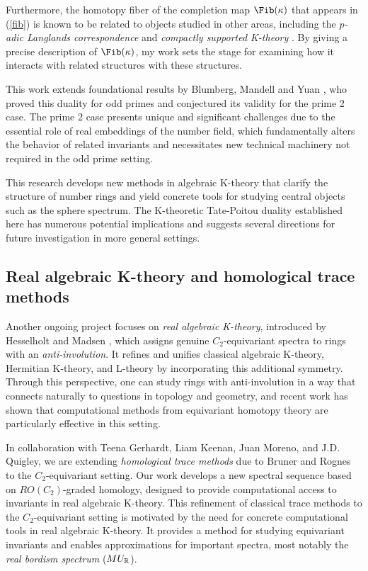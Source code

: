 \documentclass[11pt]{article}
\begin{document}
Furthermore, the homotopy fiber of the completion map $\Fib(\ka)$ that appears in (\ref{fib}) is known to be related to objects studied in other areas, including the {\it $p$-adic Langlands correspondence} \cite{MR2905536} and {\it compactly supported K-theory} \cite{MR3211458}. 
By giving a precise description of $\Fib(\ka)$, my work sets the stage for examining how it interacts with related structures with these structures.

This work extends foundational results by Blumberg, Mandell and Yuan \cite{MR4121155,BMY}, who proved this duality for odd primes and conjectured its validity for the prime 2 case. The prime 2 case presents unique and significant challenges due to the essential role of real embeddings of the number field, which fundamentally alters the behavior of related invariants and necessitates new technical machinery not required in the odd prime setting.

This research develops new methods in algebraic K-theory that clarify the structure of number rings and yield concrete tools for studying central objects such as the sphere spectrum.
The K-theoretic Tate-Poitou duality established here has numerous potential implications and suggests several directions for future investigation in more general settings.

\subsection{Real algebraic K-theory and homological trace methods}
Another ongoing project focuses on {\it real algebraic K-theory}, introduced by Hesselholt and Madsen \cite{HMreal}, which assigns genuine $C_2$-equivariant spectra to rings with an {\it anti-involution}.
It refines and unifies classical algebraic K-theory, Hermitian K-theory, and L-theory by incorporating this additional symmetry.
Through this perspective, one can study rings with anti-involution in a way that connects naturally to questions in topology and geometry, and recent work has shown that computational methods from equivariant homotopy theory are particularly effective in this setting.

In collaboration with Teena Gerhardt, Liam Keenan, Juan Moreno, and J.D. Quigley, we are extending {\it homological trace methods} due to Bruner and Rognes \cite{MR2153113} to the $C_2$-equivariant setting. 
Our work develops a new spectral sequence based on $RO(C_2)$-graded homology, designed to provide computational access to invariants in real algebraic K-theory. 
This refinement of classical trace methods to the $C_2$-equivariant setting is motivated by the need for concrete computational tools in real algebraic K-theory. It provides a method for studying equivariant invariants and enables approximations for important spectra, most notably the {\it real bordism spectrum} ($MU_{\mathbb{R}}$).
\end{document}
